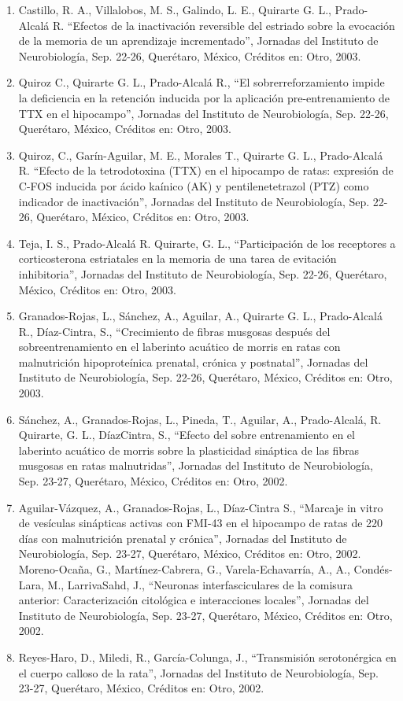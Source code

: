 \begin{enumerate}
\item Castillo, R. A., Villalobos, M. S., Galindo, L. E., Quirarte G. L., Prado-Alcalá R. “Efectos de la inactivación reversible del estriado sobre la evocación 
de la 
memoria de un aprendizaje incrementado”, Jornadas del Instituto de Neurobiología, Sep. 22-26, Querétaro, México, Créditos en: Otro, 2003.

\item Quiroz C., Quirarte G. L., Prado-Alcalá R., “El sobrerreforzamiento impide la deficiencia en la retención inducida por la aplicación pre-entrenamiento de 
TTX en 
el hipocampo”, Jornadas del Instituto de Neurobiología, Sep. 22-26, Querétaro, México, Créditos en: Otro, 2003.

\item Quiroz, C., Garín-Aguilar, M. E., Morales T., Quirarte G. L., Prado-Alcalá R. “Efecto de la tetrodotoxina (TTX) en el hipocampo de ratas: expresión de 
C-FOS 
inducida por ácido kaínico (AK) y pentilenetetrazol (PTZ) como indicador de inactivación”, Jornadas del Instituto de Neurobiología, Sep. 22-26, Querétaro, 
México, Créditos en: Otro, 2003.

\item Teja, I. S., Prado-Alcalá R. Quirarte, G. L., “Participación de los receptores a corticosterona estriatales en la memoria de una tarea de evitación 
inhibitoria”, 
Jornadas del Instituto de Neurobiología, Sep. 22-26, Querétaro, México, Créditos en: Otro, 2003.

\item Granados-Rojas, L., Sánchez, A., Aguilar, A., Quirarte G. L., Prado-Alcalá R., Díaz-Cintra, S., “Crecimiento de fibras musgosas después del 
sobreentrenamiento en 
el laberinto acuático de morris en ratas con malnutrición hipoproteínica prenatal, crónica y postnatal”, Jornadas del Instituto de Neurobiología, Sep. 22-26, 
Querétaro, México, Créditos en: Otro, 2003.
\item Sánchez, A., Granados-Rojas, L., Pineda, T., Aguilar, A., Prado-Alcalá, R. Quirarte, G. L., DíazCintra, S., “Efecto del sobre entrenamiento en el laberinto 
acuático de morris sobre la plasticidad sináptica de las fibras musgosas en ratas malnutridas”, Jornadas del Instituto de Neurobiología, Sep. 23-27, Querétaro, 
México, Créditos en: Otro, 2002.

\item Aguilar-Vázquez, A., Granados-Rojas, L., Díaz-Cintra S., “Marcaje in vitro de vesículas sinápticas activas con FMI-43 en el hipocampo de ratas de 220 días 
con 
malnutrición prenatal y crónica”, Jornadas del Instituto de Neurobiología, Sep. 23-27, Querétaro, México, Créditos en: Otro, 2002.
Moreno-Ocaña, G., Martínez-Cabrera, G., Varela-Echavarría, A., A., Condés-Lara, M., LarrivaSahd, J., “Neuronas interfasciculares de la comisura anterior: 
Caracterización citológica e interacciones locales”, Jornadas del Instituto de Neurobiología, Sep. 23-27, Querétaro, México, Créditos en: Otro, 2002.

\item Reyes-Haro, D., Miledi, R., García-Colunga, J., “Transmisión serotonérgica en el cuerpo calloso de la rata”, Jornadas del Instituto de Neurobiología, Sep. 
23-27, 
Querétaro, México, Créditos en: Otro, 2002.

\end{enumerate}


